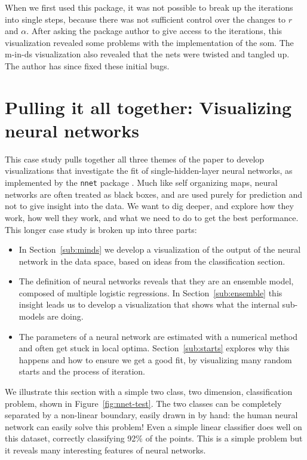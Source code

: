 \documentclass[preprint]{imsart}
\begin{document}
When we first used this package, it was not possible to break up the iterations into single steps, because there was not sufficient control over the changes to $r$ and $\alpha$.   After asking the package author to give access to the iterations, this visualization revealed some problems with the implementation of the {\sc som}.   The m-in-ds visualization also revealed that the nets were twisted and tangled up.  The author has since fixed these initial bugs.

\section{Pulling it all together: Visualizing neural networks}
\label{sec:nnet}

This case study pulls together all three themes of the paper to develop visualizations that investigate the fit of single-hidden-layer neural networks, as implemented by the {\tt nnet} package \citep{mass}.  Much like self organizing maps, neural networks are often treated as black boxes, and are used purely for prediction and not to give insight into the data. We want to dig deeper, and explore how they work, how well they work, and what we need to do to get the best performance.  This longer case study is broken up into three parts:

\begin{itemize} \itemsep 0in
  \item  In Section~\ref{sub:minds} we  develop a visualization of the output of the neural network in the data space, based on ideas from the classification section.

  \item The definition of neural networks reveals that they are an ensemble model, composed of multiple logistic regressions. In Section~\ref{sub:ensemble} this insight  leads us to develop a visualization that shows what the internal sub-models are doing.

  \item The parameters of a neural network are estimated with a numerical method and often get stuck in local optima.  Section~\ref{sub:starts} explores why this happens and how to ensure we get a good fit, by visualizing many random starts and the process of iteration.

\end{itemize}

We illustrate this section with a simple two class, two dimension, classification problem, shown in Figure~\ref{fig:nnet-test}. The two classes can be completely separated by a non-linear boundary, easily drawn in by hand: the human neural network can easily solve this problem! Even a simple linear classifier does well on this dataset, correctly classifying 92\% of the points. This is a simple problem but it reveals many interesting features of neural networks.
\end{document}
